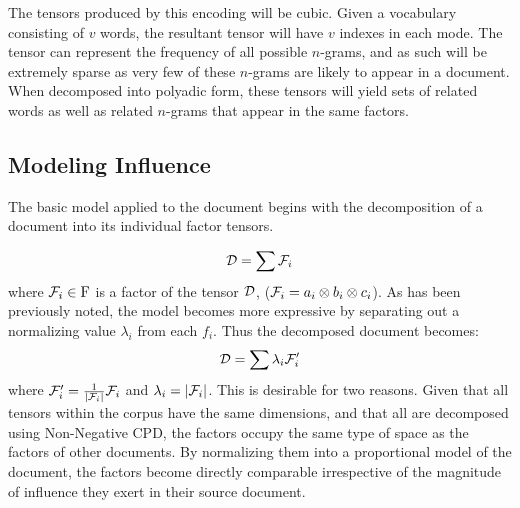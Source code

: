 \documentclass[../ut-dissertation.tex]{subfiles}
\begin{document}
The tensors produced by this encoding will be cubic.  Given a
vocabulary consisting of $v$ words, the resultant tensor will have $v$
indexes in each mode.  The tensor can represent the frequency of all
possible $n$-grams, and as such will be extremely sparse as very few
of these $n$-grams are likely to appear in a document.  When
decomposed into polyadic form, these tensors will yield sets of
related words as well as related $n$-grams that appear in the same
factors.  



\subsection{Modeling Influence}
The basic model applied to the document begins with the decomposition
of a document into its individual factor tensors.

\begin{equation} \label{eq:document_decomposition}
  \mathcal{D} = \sum \mathcal{F}_i 
\end{equation}
where $\mathcal{F}_i\in \mathrm{F}$ is a factor of the tensor $\mathcal{D}$,
($\mathcal{F}_i=a_i \otimes b_i \otimes c_i$).  As has been previously
noted, the model becomes more expressive by separating out a
normalizing value $\lambda_i$ from each $f_i$.  Thus the decomposed
document becomes:
\begin{equation} \label{eq:document_decomposition_normal}
  \mathcal{D} = \sum \lambda_i \mathcal{F}'_i
\end{equation}
where $\mathcal{F}'_i=\frac{1}{|\mathcal{F}_i|} \mathcal{F}_i$ and
$\lambda_i = |\mathcal{F}_i|$.  This is desirable for two reasons.  Given
that all tensors within the corpus have the same dimensions, and that
all are decomposed using Non-Negative CPD, the factors occupy the same
type of space as the factors of other documents.  By normalizing them
into a proportional model of the document, the factors become directly
comparable irrespective of the magnitude of influence they exert in
their source document.
\end{document}
